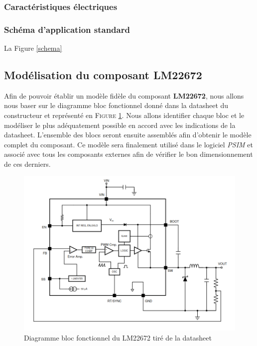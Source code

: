 			\subsubsection{Caractéristiques électriques}
			
			\subsubsection{Schéma d'application standard}
				
			La Figure \ref{schema}
				
		\subsection{Modélisation du composant LM22672}
			
		Afin de pouvoir établir un modèle fidèle du composant 
		\textbf{LM22672}, nous allons nous baser sur le diagramme bloc
		fonctionnel donné dans la datasheet du constructeur et représenté en
		\textsc{Figure \ref{func_bloc_lm22672}}. 
		Nous allons identifier chaque bloc et le modéliser le plus 
		adéquatement possible en accord avec les indications de la datasheet. 
		L'ensemble des blocs seront ensuite assemblés afin d'obtenir le modèle 
		complet du composant. Ce modèle sera finalement utilisé dans le 
		logiciel \textit{PSIM} et associé avec tous les composants externes 
		afin de vérifier le bon dimensionnement de ces derniers.
								
		\begin{figure}[h]
			\begin{center}
				\includegraphics[scale=0.5]{../Illus/func_bloc_lm22672.png}
			\end{center}
			\caption{Diagramme bloc fonctionnel du LM22672 tiré de la datasheet \cite{LM22672}}
			\label{func_bloc_lm22672}
		\end{figure}
				
